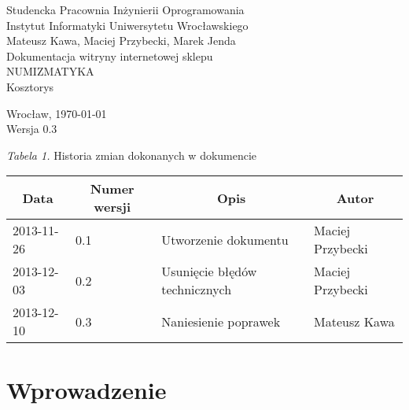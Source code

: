 \documentclass [11pt, a4paper, leqno]	{article}	%
\begin{document}

\begin{center}
	\thispagestyle{empty} 							%
	{\large Studencka Pracownia Inżynierii Oprogramowania} 		\\ [0.5cm]
	{\large Instytut Informatyki Uniwersytetu Wrocławskiego} 	\\ [6.0cm]

	{\large Mateusz Kawa, Maciej Przybecki, Marek Jenda} 		\\ [1.5cm]

	{\huge Dokumentacja witryny internetowej sklepu} 			\\ [0.5cm]
	{\huge NUMIZMATYKA} 										\\ [1.5cm]

	{\large Kosztorys} 										\\ [0.5cm]

	\vfill
	
	{\large Wrocław, \today}									\\ [0.5cm]
	{\large Wersja 0.3}
\end{center}

\newpage


\textit{Tabela 1.} Historia zmian dokonanych w dokumencie

\begin{center}
	\begin{tabular}{| l | l | l | l |}
		\hline
		\multicolumn{1}{|c|}{Data} & 
		\multicolumn{1}{|c|}{Numer wersji} &  
		\multicolumn{1}{|c|}{Opis} &
		\multicolumn{1}{|c|}{Autor} \\ \hline \hline
		2013-11-26 & 0.1 & Utworzenie dokumentu & Maciej Przybecki \\ \hline
		2013-12-03 & 0.2 & Usunięcie błędów technicznych & Maciej Przybecki \\ \hline
		2013-12-10 & 0.3 & Naniesienie poprawek & Mateusz Kawa \\ \hline
	\end{tabular}
\end{center}
\newpage


\tableofcontents

\newpage

\section{Wprowadzenie}
\end{document}
